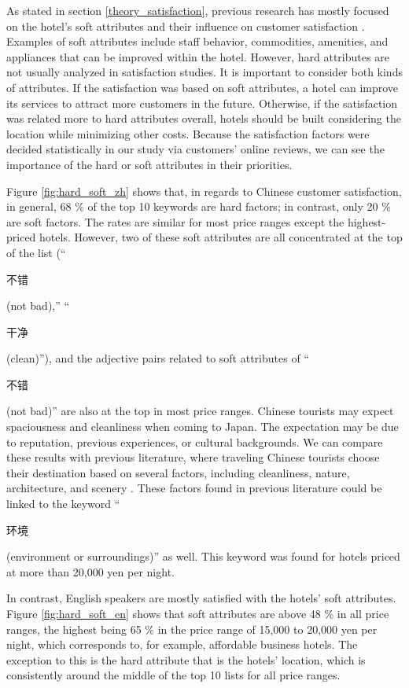 \documentclass[smallextended,natbib]{svjour3}       %
\begin{document}
    As stated in section \ref{theory_satisfaction}, previous research has mostly focused on the hotel's soft attributes and their influence on customer satisfaction \cite[e.g.,][]{shanka2004,choi2001}. Examples of soft attributes include staff behavior, commodities, amenities, and appliances that can be improved within the hotel. However, hard attributes are not usually analyzed in satisfaction studies. It is important to consider both kinds of attributes. If the satisfaction was based on soft attributes, a hotel can improve its services to attract more customers in the future. Otherwise, if the satisfaction was related more to hard attributes overall, hotels should be built considering the location while minimizing other costs. Because the satisfaction factors were decided statistically in our study via customers’ online reviews, we can see the importance of the hard or soft attributes in their priorities.

    Figure \ref{fig:hard_soft_zh} shows that, in regards to Chinese customer satisfaction, in general, 68 \% of the top 10 keywords are hard factors; in contrast, only 20 \% are soft factors. The rates are similar for most price ranges except the highest-priced hotels. However, two of these soft attributes are all concentrated at the top of the list (``\begin{CJK}{UTF8}{gbsn}不错\end{CJK} (not bad),'' ``\begin{CJK}{UTF8}{gbsn}干净\end{CJK} (clean)''), and the adjective pairs related to soft attributes of ``\begin{CJK}{UTF8}{gbsn}不错\end{CJK} (not bad)'' are also at the top in most price ranges. Chinese tourists may expect spaciousness and cleanliness when coming to Japan. The expectation may be due to reputation, previous experiences, or cultural backgrounds. We can compare these results with previous literature, where traveling Chinese tourists choose their destination based on several factors, including cleanliness, nature, architecture, and scenery \cite[][]{ryan2001}. These factors found in previous literature could be linked to the keyword ``\begin{CJK}{UTF8}{gbsn}环境\end{CJK} (environment or surroundings)'' as well. This keyword was found for hotels priced at more than 20,000 yen per night. 

    In contrast, English speakers are mostly satisfied with the hotels' soft attributes. Figure \ref{fig:hard_soft_en} shows that soft attributes are above 48 \% in all price ranges, the highest being 65 \% in the price range of 15,000 to 20,000 yen per night, which corresponds to, for example, affordable business hotels. The exception to this is the hard attribute that is the hotels' location, which is consistently around the middle of the top 10 lists for all price ranges. 
\end{document}
